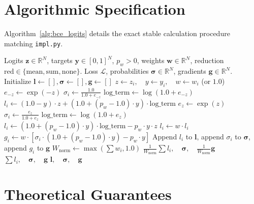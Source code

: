 \documentclass[11pt]{article}
\begin{document}
\section{Algorithmic Specification}
\label{sec:algorithm}

Algorithm~\ref{alg:bce_logits} details the exact stable calculation procedure matching \texttt{impl.py}.

\begin{algorithm}[H]
\caption{Stable Binary Cross-Entropy with Logits and Positive Class Weighting}
\label{alg:bce_logits}
\begin{algorithmic}[1]
\Require Logits $\mathbf{z} \in \mathbb{R}^N$, targets $\mathbf{y} \in [0, 1]^N$, $p_w > 0$, weights $\mathbf{w} \in \mathbb{R}^N$, reduction $\mathrm{red} \in \{\text{mean}, \text{sum}, \text{none}\}$.
\Ensure Loss $\mathcal{L}$, probabilities $\boldsymbol{\sigma} \in \mathbb{R}^N$, gradients $\mathbf{g} \in \mathbb{R}^N$.
\State Initialize $\mathbf{l} \gets [], \boldsymbol{\sigma} \gets [], \mathbf{g} \gets []$
    \State $z \gets z_i, \quad y \gets y_i, \quad w \gets w_i$ (or $1.0$)
        \State $e_{-z} \gets \exp(-z)$
        \State $\sigma_i \gets \frac{1.0}{1.0 + e_{-z}}$
        \State $\mathrm{log\_term} \gets \log(1.0 + e_{-z})$
        \State $l_i \gets (1.0 - y) \cdot z + (1.0 + (p_w - 1.0) \cdot y) \cdot \mathrm{log\_term}$
    \Else
        \State $e_z \gets \exp(z)$
        \State $\sigma_i \gets \frac{e_z}{1.0 + e_z}$
        \State $\mathrm{log\_term} \gets \log(1.0 + e_z)$
        \State $l_i \gets (1.0 + (p_w - 1.0) \cdot y) \cdot \mathrm{log\_term} - p_w \cdot y \cdot z$
    \EndIf
    \State $l_i \gets w \cdot l_i$
    \State $g_i \gets w \cdot \left[ \sigma_i \cdot (1.0 + (p_w - 1.0) \cdot y) - p_w \cdot y \right]$
    \State Append $l_i$ to $\mathbf{l}$, append $\sigma_i$ to $\boldsymbol{\sigma}$, append $g_i$ to $\mathbf{g}$
\EndFor
{}
    \State $W_{\mathrm{norm}} \gets \max(\sum w_i, 1.0)$
    \State \Return $\frac{1}{W_{\mathrm{norm}}}\sum l_i, \quad \boldsymbol{\sigma}, \quad \frac{1}{W_{\mathrm{norm}}}\mathbf{g}$
    \State \Return $\sum l_i, \quad \boldsymbol{\sigma}, \quad \mathbf{g}$
\Else
    \State \Return $\mathbf{l}, \quad \boldsymbol{\sigma}, \quad \mathbf{g}$
\EndIf
\end{algorithmic}
\end{algorithm}

\section{Theoretical Guarantees}
\label{sec:guarantees}
\end{document}
